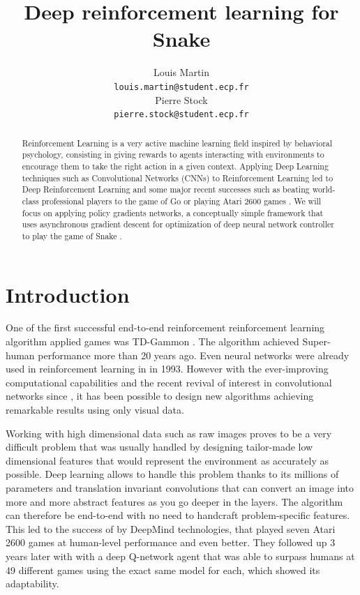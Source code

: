 \documentclass{article}
\title{Deep reinforcement learning for Snake}
\author{
  Louis Martin \\
  \texttt{louis.martin@student.ecp.fr} \\
  \And
  Pierre Stock \\
  \texttt{pierre.stock@student.ecp.fr} \\
}
\begin{document}
\maketitle

\begin{abstract}
  Reinforcement Learning is a very active machine learning field inspired by behavioral psychology, consisting in giving rewards to agents interacting with environments to encourage them to take the right action in a given context.
  Applying Deep Learning techniques such as Convolutional Networks (CNNs) to Reinforcement Learning led to Deep Reinforcement Learning and some major recent successes such as beating world-class professional players to the game of Go \cite{silver2016go} or playing Atari 2600 games \cite{mnih2013playing}.
  We will focus on applying policy gradients networks, a conceptually simple framework that uses asynchronous gradient descent for optimization of deep neural network controller to play the game of Snake \cite{mnih2016asynchronous}.
\end{abstract}

\section{Introduction}
One of the first successful end-to-end reinforcement reinforcement learning algorithm applied games was TD-Gammon \cite{tesauro1995temporal}.
The algorithm achieved Super-human performance more than 20 years ago.
Even neural networks were already used in reinforcement learning in \cite{lin1993reinforcement} in 1993.
However with the ever-improving computational capabilities and the recent revival of interest in convolutional networks since \cite{krizhevsky2012imagenet}, it has been possible to design new algorithms achieving remarkable results using only visual data.

  Working with high dimensional data such as raw images proves to be a very difficult problem that was usually handled by designing tailor-made low dimensional features that would represent the environment as accurately as possible.
 Deep learning allows to handle this problem thanks to its millions of parameters and translation invariant convolutions that can convert an image into more and more abstract features as you go deeper in the layers.
The algorithm can therefore be end-to-end with no need to handcraft problem-specific features.
 This led to the success of \cite{bellemare2012arcade} by DeepMind technologies, that played seven Atari 2600 games at human-level performance and even better.
They followed up 3 years later with \cite{mnih2015human} with a deep Q-network agent that was able to surpass humans at 49 different games using the exact same model for each, which showed its adaptability.
\end{document}

